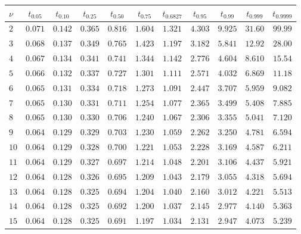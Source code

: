 
\begin{table}[htb!]
\begin{center}
{\scriptsize
\renewcommand\arraystretch{1.250000}
\begin{tabular}{p{22 pt}cccccccccc}
\hline

\rule[-2pt]{0pt}{14pt}$\nu$ & $t_{0.05}$ & $t_{0.10}$ & $t_{0.25}$ & $t_{0.50}$ & $t_{0.75}$ & $t_{0.6827}$ & $t_{0.95}$ & $t_{0.99}$ & $t_{0.999}$ & $t_{0.9999}$\\
\hline
\hline
\rule[0pt]{0pt}{15pt}$2$ & $0.071$ & $0.142$ & $0.365$ & $0.816$ & $1.604$ & $1.321$ & $4.303$ & $9.925$ & $31.60$ & $99.99$\\
$3$ & $0.068$ & $0.137$ & $0.349$ & $0.765$ & $1.423$ & $1.197$ & $3.182$ & $5.841$ & $12.92$ & $28.00$\\
$4$ & $0.067$ & $0.134$ & $0.341$ & $0.741$ & $1.344$ & $1.142$ & $2.776$ & $4.604$ & $8.610$ & $15.54$\\
$5$ & $0.066$ & $0.132$ & $0.337$ & $0.727$ & $1.301$ & $1.111$ & $2.571$ & $4.032$ & $6.869$ & $11.18$\\
$6$ & $0.065$ & $0.131$ & $0.334$ & $0.718$ & $1.273$ & $1.091$ & $2.447$ & $3.707$ & $5.959$ & $9.082$\\
$7$ & $0.065$ & $0.130$ & $0.331$ & $0.711$ & $1.254$ & $1.077$ & $2.365$ & $3.499$ & $5.408$ & $7.885$\\
$8$ & $0.065$ & $0.130$ & $0.330$ & $0.706$ & $1.240$ & $1.067$ & $2.306$ & $3.355$ & $5.041$ & $7.120$\\
$9$ & $0.064$ & $0.129$ & $0.329$ & $0.703$ & $1.230$ & $1.059$ & $2.262$ & $3.250$ & $4.781$ & $6.594$\\
$10$ & $0.064$ & $0.129$ & $0.328$ & $0.700$ & $1.221$ & $1.053$ & $2.228$ & $3.169$ & $4.587$ & $6.211$\\
$11$ & $0.064$ & $0.129$ & $0.327$ & $0.697$ & $1.214$ & $1.048$ & $2.201$ & $3.106$ & $4.437$ & $5.921$\\
$12$ & $0.064$ & $0.128$ & $0.326$ & $0.695$ & $1.209$ & $1.043$ & $2.179$ & $3.055$ & $4.318$ & $5.694$\\
$13$ & $0.064$ & $0.128$ & $0.325$ & $0.694$ & $1.204$ & $1.040$ & $2.160$ & $3.012$ & $4.221$ & $5.513$\\
$14$ & $0.064$ & $0.128$ & $0.325$ & $0.692$ & $1.200$ & $1.037$ & $2.145$ & $2.977$ & $4.140$ & $5.363$\\
$15$ & $0.064$ & $0.128$ & $0.325$ & $0.691$ & $1.197$ & $1.034$ & $2.131$ & $2.947$ & $4.073$ & $5.239$\\

\end{tabular}}
\end{center}
\end{table}
